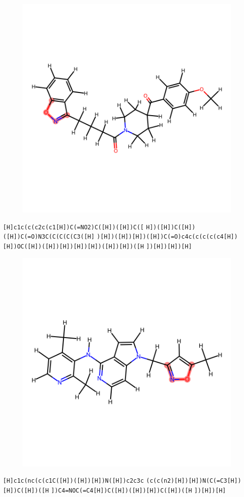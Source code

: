 \documentclass{article}
\begin{document}
\begin{figure}[ht]
\centering
    \includegraphics{mol74.png}
\end{figure}
\verb|[H]c1c(c(c2c(c1[H])C(=NO2)C([H])([H])C([| \verb|H])([H])C([H])([H])C(=O)N3C(C(C(C(C3([H]| \verb|)[H])([H])[H])([H])C(=O)c4c(c(c(c(c4[H])| \verb|[H])OC([H])([H])[H])[H])[H])([H])[H])([H| \verb|])[H])[H])[H]|

\begin{figure}[ht]
\centering
    \includegraphics{mol75.png}
\end{figure}
\verb|[H]c1c(nc(c(c1C([H])([H])[H])N([H])c2c3c| \verb|(c(c(n2)[H])[H])N(C(=C3[H])[H])C([H])([H| \verb|])C4=NOC(=C4[H])C([H])([H])[H])C([H])([H| \verb|])[H])[H]|
\end{document}
